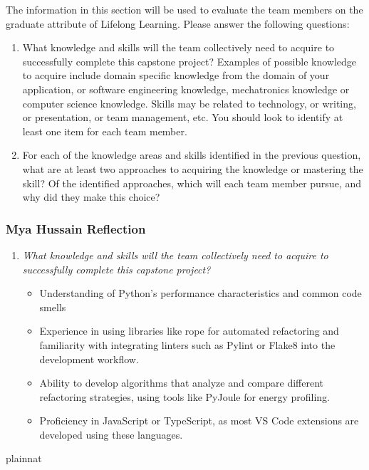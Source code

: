 \documentclass[12pt]{article}
\begin{document}
The information in this section will be used to evaluate the team members on the
graduate attribute of Lifelong Learning.  Please answer the following questions:

\begin{enumerate}
  \item What knowledge and skills will the team collectively need to acquire to
  successfully complete this capstone project?  Examples of possible knowledge
  to acquire include domain specific knowledge from the domain of your
  application, or software engineering knowledge, mechatronics knowledge or
  computer science knowledge.  Skills may be related to technology, or writing,
  or presentation, or team management, etc.  You should look to identify at
  least one item for each team member.
  \item For each of the knowledge areas and skills identified in the previous
  question, what are at least two approaches to acquiring the knowledge or
  mastering the skill?  Of the identified approaches, which will each team
  member pursue, and why did they make this choice?
\end{enumerate}

\subsubsection*{Mya Hussain Reflection}
\begin{enumerate}
  \item \textit{What knowledge and skills will the team collectively need to acquire to successfully complete this capstone project?}

    \begin{itemize}
      \item Understanding of Python's performance characteristics and common code smells
      \item Experience in using libraries like rope for automated refactoring and familiarity with integrating linters such as Pylint or Flake8 into the development workflow.
      \item Ability to develop algorithms that analyze and compare different refactoring strategies, using tools like PyJoule for energy profiling.
      \item  Proficiency in JavaScript or TypeScript, as most VS Code extensions are developed using these languages.
    \end{itemize}
 
\end{enumerate}

 {plainnat}

\end{document}
